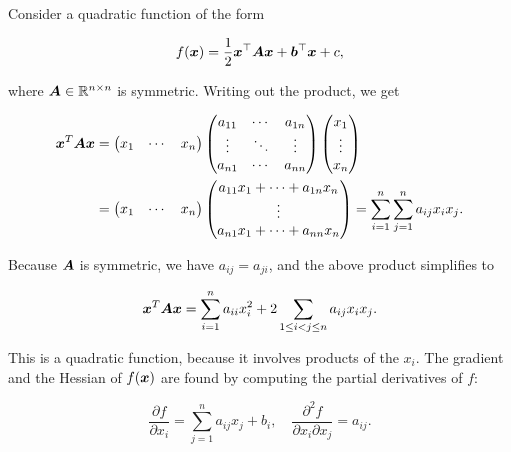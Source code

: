 \begin{example}\label{ex:quad}
 Consider a quadratic function of the form
 
 \begin{equation*}
f(\bm{x}) = \frac{1}{2}\bm{x}^{\top}\bm{A}\bm{x}+\bm{b}^{\top}\bm{x}+c, 
 \end{equation*}
 
 where $\bm{A}\in \mathbb{R}^{n\times n}$ is symmetric. Writing out the product, we get
 
 \begin{align*}
   \bm{x}^{T}\bm{A}\bm{x} &= \begin{pmatrix} x_1 & \cdots & x_n
   \end{pmatrix}
   \begin{pmatrix}
   a_{11} & \cdots & a_{1n}\\
   \vdots & \ddots & \vdots\\
   a_{n1} & \cdots & a_{nn}
   \end{pmatrix}
   \begin{pmatrix}
   x_1\\ \vdots \\ x_n
   \end{pmatrix} \\
   &= \begin{pmatrix}
   x_1 & \cdots & x_n
   \end{pmatrix}
   \begin{pmatrix}
   a_{11}x_1+\cdots+a_{1n}x_n\\
   \vdots \\
   a_{n1}x_1+\cdots+a_{nn}x_n
   \end{pmatrix} = \sum_{i=1}^n \sum_{j=1}^n a_{ij} x_i x_j.
 \end{align*} 
 
 Because $\bm{A}$ is symmetric, we have $a_{ij}=a_{ji}$, and the above product simplifies to
 
 \begin{equation*}
 \bm{x}^{T}\bm{A}\bm{x} = \sum_{i=1}^n a_{ii} x_i^2 + 2\sum_{1\leq i<j\leq n} a_{ij}x_i x_j.
 \end{equation*}
 
 This is a quadratic function, because it involves products of the $x_i$. The gradient and the Hessian of $f(\bm{x})$ are found by computing the partial derivatives of $f$:
 
 \begin{equation*}
 \frac{\partial f}{\partial x_i} = \sum_{j=1}^n a_{ij} x_j + b_i, \quad \frac{\partial^2 f}{\partial x_i \partial x_j} = a_{ij}.
 \end{equation*}
 

\end{example}
